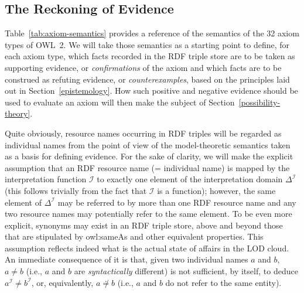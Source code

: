 \documentclass[a4paper]{article}
\newcounter{ex}
\begin{document}
\subsection{The Reckoning of Evidence}

Table~\ref{tab:axiom-semantics} provides a reference of the semantics
of the 32 axiom types of OWL~2. We will take those semantics as a starting point to define,
for each axiom type, which facts recorded in the RDF triple store are to be taken as
supporting evidence, or \emph{confirmations} of the axiom and which facts are to be
construed as refuting evidence, or \emph{counterexamples}, based on the principles
laid out in Section~\ref{epistemology}.
How such positive and negative evidence should be used to evaluate an axiom
will then make the subject of Section~\ref{possibility-theory}.

Quite obviously, resource names occurring in RDF triples will be regarded as
individual names from the point of view of the model-theoretic semantics taken as
a basis for defining evidence. For the sake of clarity, we will make the explicit
assumption that an RDF resource name (= individual name) is mapped by the interpretation
function $\mathcal{I}$ to exactly one element of the interpretation domain $\Delta^\mathcal{I}$
(this follows trivially from the fact that $\mathcal{I}$ is a function);
however, the same element of $\Delta^\mathcal{I}$ may be referred to by more than one
RDF resource name and any two resource names may potentially refer to the same element.
To be even more explicit, synonyms may exist in an RDF triple store, above and beyond
those that are stipulated by \textsf{owl:sameAs} and other equivalent properties.
This assumption reflects indeed what is the actual state of affairs in the LOD cloud.
An immediate consequence of it is that, given two individual names $a$ and $b$,
$a \neq b$ (i.e., $a$ and $b$ are \emph{syntactically} different) is not sufficient,
by itself, to deduce $a^\mathcal{I} \neq b^\mathcal{I}$, or, equivalently, $a \not\doteq b$
(i.e., $a$ and $b$ do not refer to the same entity).
\end{document}
